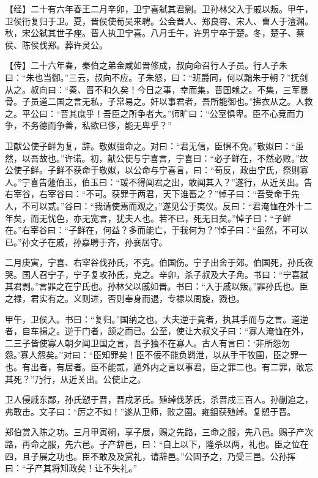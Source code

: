 \documentclass[]{article}
\begin{document}
【经】二十有六年春王二月辛卯，卫宁喜弑其君剽。卫孙林父入于戚以叛。甲午，卫侯衎复归于卫。夏，晋侯使荀吴来聘。公会晋人、郑良霄、宋人、曹人于澶渊。秋，宋公弑其世子痤。晋人执卫宁喜。八月壬午，许男宁卒于楚。冬，楚子、蔡侯、陈侯伐郑。葬许灵公。

【传】二十六年春，秦伯之弟金咸如晋修成，叔向命召行人子员。行人子朱曰：``朱也当御。''三云，叔向不应。子朱怒，曰：``班爵同，何以黜朱于朝？''抚剑从之。叔向曰：``秦、晋不和久矣！今日之事，幸而集，晋国赖之。不集，三军暴骨。子员道二国之言无私，子常易之。奸以事君者，吾所能御也。''拂衣从之。人救之。平公曰：``晋其庶乎！吾臣之所争者大。''师旷曰：``公室惧卑。臣不心竞而力争，不务德而争善，私欲已侈，能无卑乎？''

卫献公使子鲜为复，辞。敬姒强命之。对曰：``君无信，臣惧不免。''敬姒曰：``虽然，以吾故也。''许诺。初，献公使与宁喜言，宁喜曰：``必子鲜在，不然必败。''故公使子鲜。子鲜不获命于敬姒，以公命与宁喜言，曰：``苟反，政由宁氏，祭则寡人。''宁喜告蘧伯玉，伯玉曰：``瑗不得闻君之出，敢闻其入？''遂行，从近关出。告右宰谷，右宰谷曰：``不可。获罪于两君，天下谁畜之？''悼子曰：``吾受命于先人，不可以贰。''谷曰：``我请使焉而观之。''遂见公于夷仪。反曰：``君淹恤在外十二年矣，而无忧色，亦无宽言，犹夫人也。若不已，死无日矣。''悼子曰：``子鲜在。''右宰谷曰：``子鲜在，何益？多而能亡，于我何为？''悼子曰：``虽然，不可以已。''孙文子在戚，孙嘉聘于齐，孙襄居守。

二月庚寅，宁喜、右宰谷伐孙氏，不克。伯国伤。宁子出舍于郊。伯国死，孙氏夜哭。国人召宁子，宁子复攻孙氏，克之。辛卯，杀子叔及大子角。书曰：``宁喜弑其君剽。''言罪之在宁氏也。孙林父以戚如晋。书曰：``入于戚以叛。''罪孙氏也。臣之禄，君实有之。义则进，否则奉身而退，专禄以周旋，戮也。

甲午，卫侯入。书曰：``复归。''国纳之也。大夫逆于竟者，执其手而与之言。道逆者，自车揖之。逆于门者，颔之而已。公至，使让大叔文子曰：``寡人淹恤在外，二三子皆使寡人朝夕闻卫国之言，吾子独不在寡人。古人有言曰：`非所怨勿怨。'寡人怨矣。''对曰：``臣知罪矣！臣不佞不能负羁泄，以从手干牧圉，臣之罪一也。有出者，有居者。臣不能贰，通外内之言以事君，臣之罪二也。有二罪，敢忘其死？''乃行，从近关出。公使止之。

卫人侵戚东鄙，孙氏愬于晋，晋戍茅氏。殖绰伐茅氏，杀晋戍三百人。孙蒯追之，弗敢击。文子曰：``厉之不如！''遂从卫师，败之圉。雍鉏获殖绰。复愬于晋。

郑伯赏入陈之功。三月甲寅朔，享子展，赐之先路，三命之服，先八邑。赐子产次路，再命之服，先六邑。子产辞邑，曰：``自上以下，隆杀以两，礼也。臣之位在四，且子展之功也。臣不敢及及赏礼，请辞邑。''公固予之，乃受三邑。公孙挥曰：``子产其将知政矣！让不失礼。''
\end{document}
